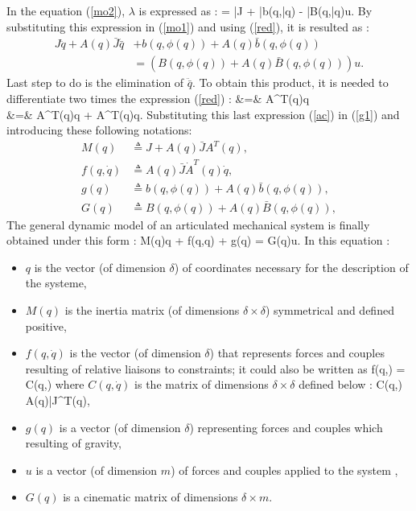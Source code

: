 \vspace{5mm}


In the equation (\ref{mo2}), $\lambda$ is expressed as :
\eqnn
\lambda = \bar{J} + \bar{b}(q,\bar{q}) - \bar{B}(q,\bar{q})u.
\eeqnn
By substituting this expression  in  (\ref{mo1}) and using (\ref{red}), it is resulted as :
\begin{equation} \begin{split}
J\ddot{q} + A(q)\bar{J}\ddot{\bar{q}} &+ b(q,\phi(q)) + A(q)\bar{b}(q,\phi(q)) \\
&= (B(q,\phi(q)) + A(q)\bar{B}(q,\phi(q)))u \label{g1}.
\end{split} \end{equation}
Last step to do is the elimination of $\ddot {\bar q}$. To obtain this product, it is needed to differentiate two times the expression (\ref{red}) :
\eqn
{} &=& A^{T}(q)\dot q \\
  &=& A^{T}(q)\ddot q + \dot A^T(q)\dot q. \label{ac}
\eeqn
Substituting this last expression  (\ref{ac}) in (\ref{g1}) and introducing these following notations:
\begin{equation*} \begin{split}
M(q) &\triangleq J + A(q)\bar{J}A^{T}(q), \\
f(q,\dot{q}) &\triangleq A(q)\bar{J}\dot{A}^{T}(q)\dot{q}, \\
g(q) &\triangleq b(q,\phi(q)) + A(q)\bar{b}(q,\phi(q)), \\
G(q) &\triangleq B(q,\phi(q)) + A(q)\bar{B}(q,\phi(q)),
\end{split} \end{equation*}
The general dynamic model of an articulated mechanical system is finally obtained under this form :
\eqn
M(q)\ddot q + f(q,\dot q) + g(q) = G(q)u. \label{modmecgen}
\eeqn
\noindent In this equation :
\begin{itemize}
\item $q$ is the vector (of dimension $\delta$) of coordinates  necessary for the description of the systeme,
\item $M(q)$ is the inertia matrix (of dimensions $\delta \times \delta$) symmetrical and defined positive,
\item $f(q,\dot{q})$ is the vector (of dimension $\delta$) that represents forces and couples resulting  of relative liaisons  to constraints; it could also be written as 
\eqnn
f(q,) = C(q,)
\eeqnn
where $C(q,\dot{q})$ is the matrix of dimensions $\delta \times \delta$ defined below :
\eqnn
C(q,) \triangleq A(q)\bar{J}^{T}(q),
\eeqnn
\item $g(q)$ is a vector (of dimension $\delta$) representing forces and couples which resulting of gravity,
\item $u$ is a vector (of dimension $m$) of forces and couples applied to the system ,
\item $G(q)$ is a cinematic matrix of dimensions  $\delta \times m$.
\end{itemize}

